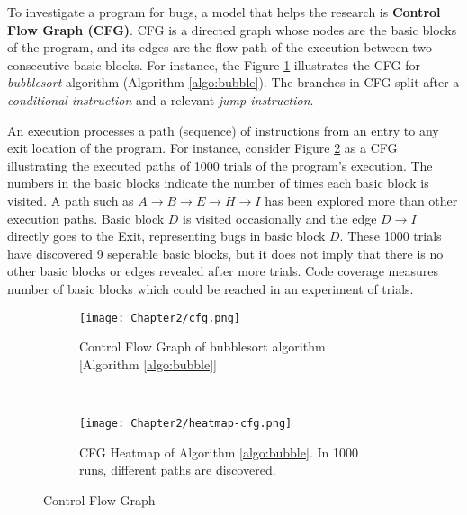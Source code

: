 To investigate a program for bugs, a model that helps the research is \textbf{Control Flow Graph (CFG)}. CFG is a directed graph whose nodes are the basic blocks of the program, and its edges are the flow path of the execution between two consecutive basic blocks. For instance, the Figure \ref{fig:cfg} illustrates the CFG for \textit{bubblesort} algorithm (Algorithm \ref{algo:bubble}). The branches in CFG split after a \textit{conditional instruction} and a relevant \textit{jump instruction}.

An execution processes a path (sequence) of instructions from an entry to any exit location of the program. For instance, consider Figure \ref{fig:cfg-heat} as a CFG illustrating the executed paths of 1000 trials of the program's execution. The numbers in the basic blocks indicate the number of times each basic block is visited. A path such as $A \rightarrow B \rightarrow E \rightarrow H \rightarrow I$ has been explored more than other execution paths. Basic block $D$ is visited occasionally and the edge $D \rightarrow I$ directly goes to the Exit, representing bugs in basic block $D$. These 1000 trials have discovered 9 seperable basic blocks, but it does not imply that there is no other basic blocks or edges revealed after more trials. Code coverage measures number of basic blocks which could be reached in an experiment of trials.

\begin{figure}[!t]
  \begin{adjustbox}{center,max width=1.3\textwidth}
    \begin{subfigure}[t]{0.35\textwidth}
      \centering
      \texttt{[image: Chapter2/cfg.png]}
      \vspace*{-5mm}
      \caption{Control Flow Graph of bubblesort algorithm [Algorithm \ref{algo:bubble}]}
      \label{fig:cfg}
      \vspace*{5mm}
    \end{subfigure}
    ~
    \hspace*{5mm}
    \begin{subfigure}[b]{0.35\textwidth}
      \centering
      \texttt{[image: Chapter2/heatmap-cfg.png]}
      \vspace*{-5mm}
      \caption{CFG Heatmap of Algorithm \ref{algo:bubble}. In 1000 runs, different paths are discovered.}
      \label{fig:cfg-heat}
      \vspace*{5mm}
    \end{subfigure}
  \end{adjustbox}
  \caption{Control Flow Graph}
  \label{fig:cfgs}
\end{figure}

